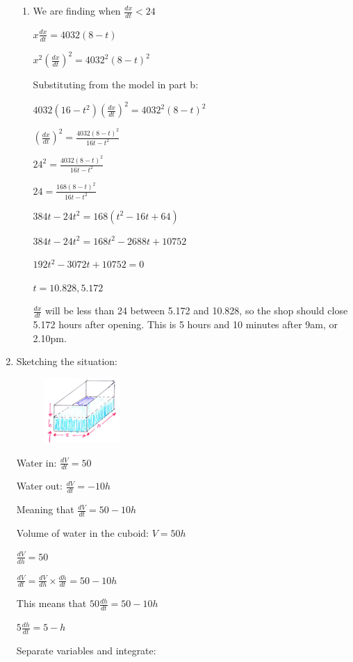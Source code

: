 \documentclass[../main.tex]{subfiles}
\begin{document}
\begin{spacing}{1.5}
\begin{enumerate}[itemsep=0.7cm]
\begin{enumerate}[itemsep=0.7cm]
        \item 
        We are finding when $\frac{dx}{dt}<24$

        $x\frac{dx}{dt}=4032(8-t)$

        $x^2(\frac{dx}{dt})^2=4032^2(8-t)^2$

        Substituting from the model in part b:

        $4032(16-t^2)(\frac{dx}{dt})^2=4032^2(8-t)^2$

        $(\frac{dx}{dt})^2=\frac{4032(8-t)^2}{16t-t^2}$

        $24^2=\frac{4032(8-t)^2}{16t-t^2}$

        $24=\frac{168(8-t)^2}{16t-t^2}$

        $384t-24t^2=168(t^2-16t+64)$

        $384t-24t^2=168t^2-2688t+10752$

        $192t^2-3072t+10752=0$

        $t=10.828, 5.172$

        $\frac{dx}{dt}$ will be less than 24 between 5.172 and 10.828, so the shop should close 5.172 hours after opening. This is 5 hours and 10 minutes after 9am, or 2.10pm.

    \end{enumerate}

    \item 
    Sketching the situation:
    \begin{figure}[h]
        \centering
        \includegraphics{images/diffeqns.png}
    \end{figure}

    Water in: $\frac{dV}{dt}=50$

    Water out: $\frac{dV}{dt}=-10h$

    Meaning that $\frac{dV}{dt}=50-10h$

    Volume of water in the cuboid: $V=50h$

    $\frac{dV}{dh}=50$

    $\frac{dV}{dt}=\frac{dV}{dh}\times \frac{dh}{dt}=50-10h$

    This means that $50\frac{dh}{dt}=50-10h$

    $5\frac{dh}{dt}=5-h$

    Separate variables and integrate:


\end{enumerate}
\end{spacing}
\end{document}
